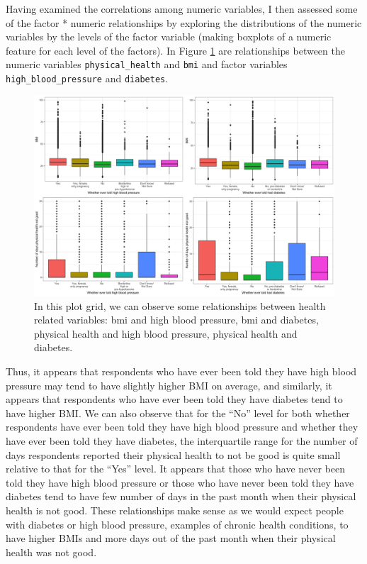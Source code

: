 \documentclass[
]{article}
\begin{document}
Having examined the correlations among numeric variables, I then assessed some of the factor * numeric relationships by exploring the distributions of the numeric variables by the levels of the factor variable (making boxplots of a numeric feature for each level of the factors). In Figure \ref{fig:physical-health-relationships-plot-grid} are relationships between the numeric variables \texttt{physical\_health} and \texttt{bmi} and factor variables \texttt{high\_blood\_pressure} and \texttt{diabetes}.

\begin{figure}[H]

{\centering \includegraphics[width=1\linewidth]{../results/physical-health-relationships-plot-grid} 

}

\caption{In this plot grid, we can observe some relationships between health related variables: bmi and high blood pressure, bmi and diabetes, physical health and high blood pressure, physical health and diabetes.}\label{fig:physical-health-relationships-plot-grid}
\end{figure}

Thus, it appears that respondents who have ever been told they have high blood pressure may tend to have slightly higher BMI on average, and similarly, it appears that respondents who have ever been told they have diabetes tend to have higher BMI. We can also observe that for the ``No'' level for both whether respondents have ever been told they have high blood pressure and whether they have ever been told they have diabetes, the interquartile range for the number of days respondents reported their physical health to not be good is quite small relative to that for the ``Yes'' level. It appears that those who have never been told they have high blood pressure or those who have never been told they have diabetes tend to have few number of days in the past month when their physical health is not good. These relationships make sense as we would expect people with diabetes or high blood pressure, examples of chronic health conditions, to have higher BMIs and more days out of the past month when their physical health was not good.
\end{document}
